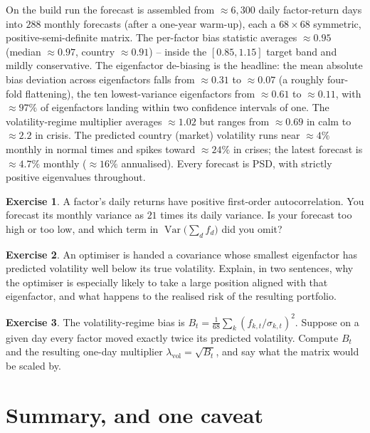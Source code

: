 \documentclass[11pt]{article}
\theoremstyle{definition}
\newtheorem{exercise}{Exercise}[section]
\theoremstyle{plain}
\theoremstyle{remark}
\DeclareMathOperator{\Var}{Var}
\begin{document}
\begin{observed}
On the build run the forecast is assembled from $\approx 6{,}300$ daily factor-return days into $288$ monthly forecasts (after a one-year warm-up), each a $68\times68$ symmetric, positive-semi-definite matrix. The per-factor bias statistic averages $\approx 0.95$ (median $\approx 0.97$, country $\approx 0.91$) -- inside the $[0.85,1.15]$ target band and mildly conservative. The eigenfactor de-biasing is the headline: the mean absolute bias deviation across eigenfactors falls from $\approx 0.31$ to $\approx 0.07$ (a roughly four-fold flattening), the ten lowest-variance eigenfactors from $\approx 0.61$ to $\approx 0.11$, with $\approx 97\%$ of eigenfactors landing within two confidence intervals of one. The volatility-regime multiplier averages $\approx 1.02$ but ranges from $\approx 0.69$ in calm to $\approx 2.2$ in crisis. The predicted country (market) volatility runs near $\approx 4\%$ monthly in normal times and spikes toward $\approx 24\%$ in crises; the latest forecast is $\approx 4.7\%$ monthly ($\approx 16\%$ annualised). Every forecast is PSD, with strictly positive eigenvalues throughout.
\end{observed}

\begin{exercise}
A factor's daily returns have positive first-order autocorrelation. You forecast its monthly variance as $21$ times its daily variance. Is your forecast too high or too low, and which term in $\Var\!\big(\sum_d f_d\big)$ did you omit?
\end{exercise}

\begin{exercise}
An optimiser is handed a covariance whose smallest eigenfactor has predicted volatility well below its true volatility. Explain, in two sentences, why the optimiser is especially likely to take a large position aligned with that eigenfactor, and what happens to the realised risk of the resulting portfolio.
\end{exercise}

\begin{exercise}
The volatility-regime bias is $B_t=\frac1{68}\sum_k (f_{k,t}/\sigma_{k,t})^2$. Suppose on a given day every factor moved exactly twice its predicted volatility. Compute $B_t$ and the resulting one-day multiplier $\lambda_{\text{vol}}=\sqrt{B_t}$, and say what the matrix would be scaled by.
\end{exercise}

\section{Summary, and one caveat}\label{sec:summary}
\end{document}
